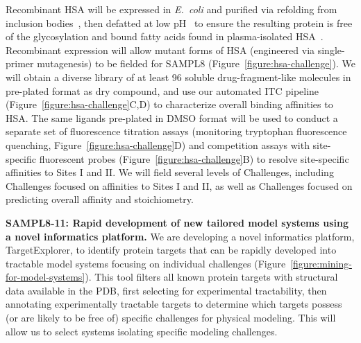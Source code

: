 \documentclass[11pt]{article}
\begin{document}
Recombinant HSA will be expressed in \emph{E.~coli} and purified via refolding from inclusion bodies~\cite{Latta:1987:Bio/Technology}, then defatted at low pH~\cite{Lang:2015:BiotechnologyProgress} to ensure the resulting protein is free of the glycosylation and bound fatty acids found in plasma-isolated HSA~\cite{Lang:2015:BiotechnologyProgress}.
Recombinant expression will allow mutant forms of HSA (engineered via single-primer mutagenesis) to be fielded for SAMPL8 (Figure~\ref{figure:hsa-challenge}).
We will obtain a diverse library of at least 96 soluble drug-fragment-like molecules in pre-plated format as dry compound, and use our automated ITC pipeline (Figure~\ref{figure:hsa-challenge}C,D) to characterize overall binding affinities to HSA.
The same ligands pre-plated in DMSO format will be used to conduct a separate set of fluorescence titration assays (monitoring tryptophan fluorescence quenching, Figure~\ref{figure:hsa-challenge}D) and competition assays with site-specific fluorescent probes (Figure~\ref{figure:hsa-challenge}B) to resolve site-specific affinities to Sites I and II.
We will field several levels of Challenges, including Challenges focused on affinities to Sites I and II, as well as Challenges focused on predicting overall affinity and stoichiometry.

\textbf{SAMPL8-11: Rapid development of new tailored model systems using a novel informatics platform.} We are developing a novel informatics platform, TargetExplorer, to identify protein targets that can be rapidly developed into tractable model systems focusing on individual challenges (Figure~\ref{figure:mining-for-model-systems}).
This tool filters all known protein targets with structural data available in the PDB, first selecting for experimental tractability, then annotating experimentally tractable targets to determine which targets possess (or are likely to be free of) specific challenges for physical modeling.
This will allow us to select systems isolating specific modeling challenges.
\end{document}
